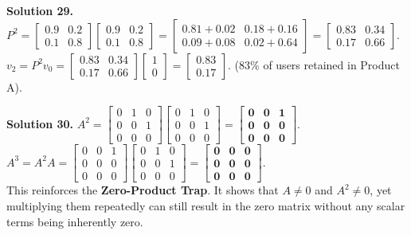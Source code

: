 \documentclass[11pt]{article}
\begin{document}
\vspace{0.2cm}\noindent\textbf{Solution 29.}
$P^2 = \begin{bmatrix} 0.9 & 0.2 \\ 0.1 & 0.8 \end{bmatrix} \begin{bmatrix} 0.9 & 0.2 \\ 0.1 & 0.8 \end{bmatrix} = \begin{bmatrix} 0.81+0.02 & 0.18+0.16 \\ 0.09+0.08 & 0.02+0.64 \end{bmatrix} = \begin{bmatrix} 0.83 & 0.34 \\ 0.17 & 0.66 \end{bmatrix}$.\\
$v_2 = P^2 v_0 = \begin{bmatrix} 0.83 & 0.34 \\ 0.17 & 0.66 \end{bmatrix} \begin{bmatrix} 1 \\ 0 \end{bmatrix} = \mathbf{\begin{bmatrix} 0.83 \\ 0.17 \end{bmatrix}}$. (83\% of users retained in Product A).

\vspace{0.2cm}\noindent\textbf{Solution 30.}
$A^2 = \begin{bmatrix} 0 & 1 & 0 \\ 0 & 0 & 1 \\ 0 & 0 & 0 \end{bmatrix} \begin{bmatrix} 0 & 1 & 0 \\ 0 & 0 & 1 \\ 0 & 0 & 0 \end{bmatrix} = \mathbf{\begin{bmatrix} 0 & 0 & 1 \\ 0 & 0 & 0 \\ 0 & 0 & 0 \end{bmatrix}}$.\\
$A^3 = A^2 A = \begin{bmatrix} 0 & 0 & 1 \\ 0 & 0 & 0 \\ 0 & 0 & 0 \end{bmatrix} \begin{bmatrix} 0 & 1 & 0 \\ 0 & 0 & 1 \\ 0 & 0 & 0 \end{bmatrix} = \mathbf{\begin{bmatrix} 0 & 0 & 0 \\ 0 & 0 & 0 \\ 0 & 0 & 0 \end{bmatrix}}$.\\
This reinforces the \textbf{Zero-Product Trap}. It shows that $A \neq 0$ and $A^2 \neq 0$, yet multiplying them repeatedly can still result in the zero matrix without any scalar terms being inherently zero.
\end{document}
